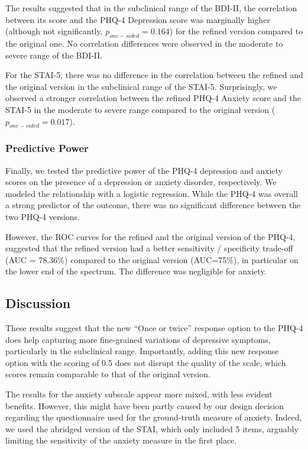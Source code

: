 \documentclass[
  man,
  floatsintext,
  longtable,
  nolmodern,
  notxfonts,
  notimes,
  colorlinks=true,linkcolor=blue,citecolor=blue,urlcolor=blue]{apa7}
\begin{document}
The results suggested that in the subclinical range of the BDI-II, the
correlation between its score and the PHQ-4 Depression score was
marginally higher (although not significantly,
\(p_{one-sided} = 0.164\)) for the refined version compared to the
original one. No correlation differences were observed in the moderate
to severe range of the BDI-II.

For the STAI-5, there was no difference in the correlation between the
refined and the original version in the subclinical range of the STAI-5.
Surprisingly, we observed a stronger correlation between the refined
PHQ-4 Anxiety score and the STAI-5 in the moderate to severe range
compared to the original version (\(p_{one-sided} = 0.017\)).

\subsubsection{Predictive Power}\label{predictive-power}

Finally, we tested the predictive power of the PHQ-4 depression and
anxiety scores on the presence of a depression or anxiety disorder,
respectively. We modeled the relationship with a logistic regression.
While the PHQ-4 was overall a strong predictor of the outcome, there was
no significant difference between the two PHQ-4 versions.

However, the ROC curves for the refined and the original version of the
PHQ-4, suggested that the refined version had a better sensitivity /
specificity trade-off (AUC = 78.36\%) compared to the original version
(AUC=75\%), in particular on the lower end of the spectrum. The
difference was negligible for anxiety.

\subsection{Discussion}\label{discussion-1}

These results suggest that the new ``Once or twice'' response option to
the PHQ-4 does help capturing more fine-grained variations of depressive
symptoms, particularly in the subclinical range. Importantly, adding
this new response option with the scoring of 0.5 does not disrupt the
quality of the scale, which scores remain comparable to that of the
original version.

The results for the anxiety subscale appear more mixed, with less
evident benefits. However, this might have been partly caused by our
design decision regarding the questionnaire used for the ground-truth
measure of anxiety. Indeed, we used the abridged version of the STAI,
which only included 5 items, arguably limiting the sensitivity of the
anxiety measure in the first place.
\end{document}

